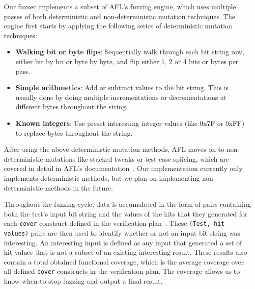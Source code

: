 \documentclass[conference]{IEEEtran}
\begin{document}
Our fuzzer implements a subset of AFL's fuzzing engine, which uses multiple passes of both deterministic and non-deterministic mutation techniques.
The engine first starts by applying the following series of deterministic mutation techniques:
\begin{itemize}
\item \textbf{Walking bit or byte flips}: Sequentially walk through each bit string row, either bit by bit or byte by byte, and flip either 1, 2 or 4 bits or bytes per pass.
\item \textbf{Simple arithmetics}: Add or subtract values to the bit string. This is usually done by doing multiple incrementations or decrementations at different bytes throughout the string.
\item \textbf{Known integers}: Use preset interesting integer values (like 0x7F or 0xFF) to replace bytes throughout the string.
\end{itemize}
After using the above deterministic mutation methods, AFL moves on to non-deterministic mutations like stacked tweaks or test case splicing, which are covered in detail in AFL's documentation~\cite{afl:fuzzingtechniques}.
Our implementation currently only implements deterministic methods, but we plan on implementing non-deterministic methods in the future.

Throughout the fuzzing cycle, data is accumulated in the form of pairs containing both the test's input bit string and the values of the hits that they generated for each \texttt{cover} construct defined in the verification plan~\cite{dobis2021opensource}.
These \texttt{(Test, hit values)} pairs are then used to identify whether or not an input bit string was interesting.
An interesting input is defined as any input that generated a set of hit values that is not a subset of an existing interesting result.
These results also contain a total obtained functional coverage, which is the average coverage over all defined \texttt{cover} constructs in the verification plan.
The coverage allows us to know when to stop fuzzing and output a final result.
\end{document}
